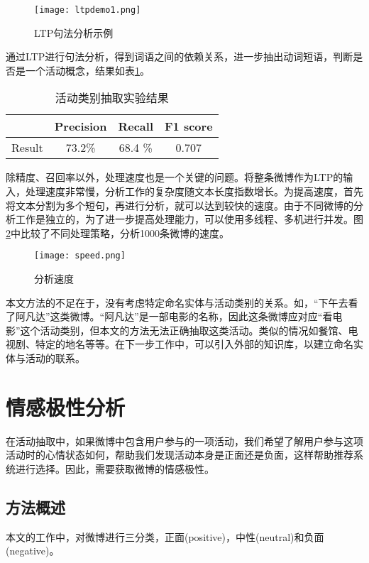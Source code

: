 \begin{figure}[!h]
\centering
\texttt{[image: ltpdemo1.png]}
\caption{LTP句法分析示例}
\label{fig:ltp_demo}
\end{figure}

通过LTP进行句法分析，得到词语之间的依赖关系，进一步抽出动词短语，判断是否是一个活动概念，结果如表\ref{table:cat_extraction}。

\begin{table}
\centering
\begin{tabular}{|c|c|c|c|}
\hline
& Precision & Recall & F1 score \\
\hline
Result & 73.2\% & 68.4 \% & 0.707 \\ 
\hline
\end{tabular}
\caption{活动类别抽取实验结果}
\label{table:cat_extraction}
\end{table}

除精度、召回率以外，处理速度也是一个关键的问题。将整条微博作为LTP的输入，处理速度非常慢，分析工作的复杂度随文本长度指数增长。为提高速度，首先将文本分割为多个短句，再进行分析，就可以达到较快的速度。由于不同微博的分析工作是独立的，为了进一步提高处理能力，可以使用多线程、多机进行并发。图\ref{fig:parse_speed}中比较了不同处理策略，分析1000条微博的速度。

\begin{figure}[!h]
\centering
\texttt{[image: speed.png]}
\caption{分析速度}
\label{fig:parse_speed}
\end{figure}

本文方法的不足在于，没有考虑特定命名实体与活动类别的关系。如，``下午去看了阿凡达''这类微博。``阿凡达''是一部电影的名称，因此这条微博应对应``看电影''这个活动类别，但本文的方法无法正确抽取这类活动。类似的情况如餐馆、电视剧、特定的地名等等。在下一步工作中，可以引入外部的知识库，以建立命名实体与活动的联系。

\section{情感极性分析}
在活动抽取中，如果微博中包含用户参与的一项活动，我们希望了解用户参与这项活动时的心情状态如何，帮助我们发现活动本身是正面还是负面，这样帮助推荐系统进行选择。因此，需要获取微博的情感极性。

\subsection{方法概述}
本文的工作中，对微博进行三分类，正面(positive)，中性(neutral)和负面(negative)。

